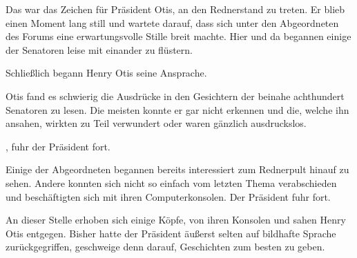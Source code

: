 \par

Das war das Zeichen für Präsident Otis, an den Rednerstand zu treten.
Er blieb einen Moment lang still und wartete darauf, dass sich unter den Abgeordneten des Forums eine erwartungsvolle Stille breit machte.
Hier und da begannen einige der Senatoren leise mit einander zu flüstern.

\par

Schließlich begann Henry Otis seine Ansprache.

\par

Otis fand es schwierig die Ausdrücke in den Gesichtern der beinahe achthundert Senatoren zu lesen.
Die meisten konnte er gar nicht erkennen und die, welche ihn ansahen, wirkten zu Teil verwundert oder waren gänzlich ausdruckslos.

\par

, fuhr der Präsident fort.

\par

Einige der Abgeordneten begannen bereits interessiert zum Rednerpult hinauf zu sehen.
Andere konnten sich nicht so einfach vom letzten Thema verabschieden und beschäftigten sich mit ihren Computerkonsolen.
Der Präsident fuhr fort.

\par

An dieser Stelle erhoben sich einige Köpfe, von ihren Konsolen und sahen Henry Otis entgegen.
Bisher hatte der Präsident äußerst selten auf bildhafte Sprache zurückgegriffen, geschweige denn darauf, Geschichten zum besten zu geben.

\par

